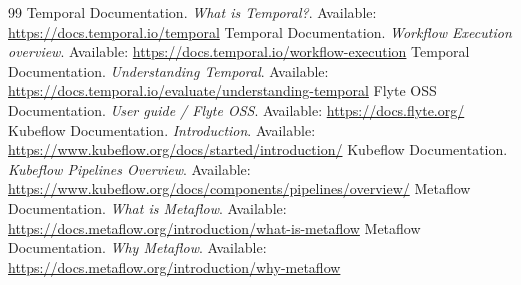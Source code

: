 \documentclass[11pt]{article}
\begin{document}
\begin{thebibliography}{99}
 Temporal Documentation. \emph{What is Temporal?}. Available: \url{https://docs.temporal.io/temporal}
 Temporal Documentation. \emph{Workflow Execution overview}. Available: \url{https://docs.temporal.io/workflow-execution}
 Temporal Documentation. \emph{Understanding Temporal}. Available: \url{https://docs.temporal.io/evaluate/understanding-temporal}
 Flyte OSS Documentation. \emph{User guide / Flyte OSS}. Available: \url{https://docs.flyte.org/}
 Kubeflow Documentation. \emph{Introduction}. Available: \url{https://www.kubeflow.org/docs/started/introduction/}
 Kubeflow Documentation. \emph{Kubeflow Pipelines Overview}. Available: \url{https://www.kubeflow.org/docs/components/pipelines/overview/}
 Metaflow Documentation. \emph{What is Metaflow}. Available: \url{https://docs.metaflow.org/introduction/what-is-metaflow}
 Metaflow Documentation. \emph{Why Metaflow}. Available: \url{https://docs.metaflow.org/introduction/why-metaflow}
\end{thebibliography}
\end{document}
